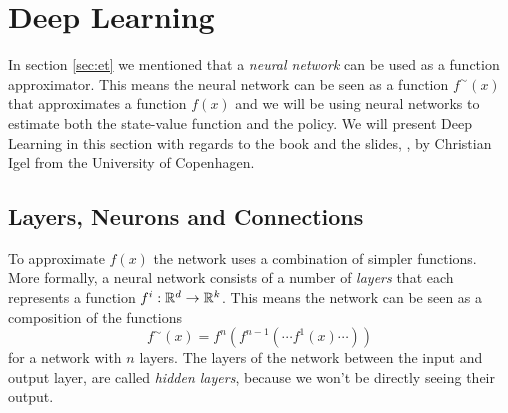 \documentclass[11pt]{article}
\begin{document}
\maketitle

\section{Deep Learning}\label{sec:deep_learning}

In section \ref{sec:et} we mentioned that
a \textit{neural network} can be used as a function approximator.
This means the neural network can be seen as a function $f^\sim(x)$ that approximates a
function $f(x)$ and we will be using neural networks to estimate
both the state-value function and the policy.
We will present Deep Learning in this section with regards to the book \cite{DeepLearningBook} and the slides, \cite{IgelConv}, by Christian Igel
from the University of Copenhagen.

\subsection{Layers, Neurons and Connections}\label{sec:lnc}

To approximate $f(x)$ the network uses a combination of simpler functions.
More formally, a neural network consists of a number of \textit{layers}
that each represents a function $f^i : \mathbb{R}^{d} \to \mathbb{R}^k$.
This means the network can be seen as a composition of the functions
\begin{equation}\label{eq:layers}
    f^\sim(x) = f^n(f^{n-1}( \cdots f^1(x) \cdots))
\end{equation}
for a network with $n$ layers.
The layers of the network between the input and output layer, are called
\textit{hidden layers}, because we won't be directly seeing their output.
\end{document}
